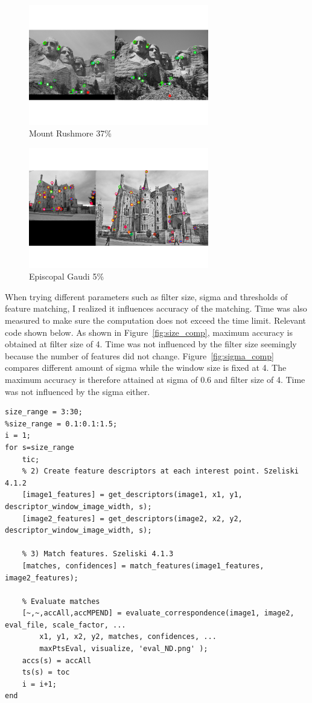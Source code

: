 \begin{figure}[h!]
	\centering
	\includegraphics[width=0.7\textwidth]{../code/eval_MR.png}
	\caption{Mount Rushmore 37\%}
	\label{fig:mr}
	\end{figure}
	
\begin{figure}[h!]
	\centering
	\includegraphics[width=0.7\textwidth]{../code/eval_EG.png}
	\caption{Episcopal Gaudi 5\%}
	\label{fig:eg}
\end{figure}

When trying different parameters such as filter size, sigma and thresholds of feature matching, I realized it influences accuracy of the matching. Time was also measured to make sure the computation does not exceed the time limit. Relevant code shown below. As shown in Figure~\ref{fig:size_comp}, maximum accuracy is obtained at filter size of 4. Time was not influenced by the filter size seemingly because the number of features did not change. Figure~\ref{fig:sigma_comp} compares different amount of sigma while the window size is fixed at 4. The maximum accuracy is therefore attained at sigma of 0.6 and filter size of 4. Time was not influenced by the sigma either.
\begin{lstlisting}[style=Matlab-editor]
size_range = 3:30;
%size_range = 0.1:0.1:1.5;
i = 1;
for s=size_range
	tic;
	% 2) Create feature descriptors at each interest point. Szeliski 4.1.2
	[image1_features] = get_descriptors(image1, x1, y1, descriptor_window_image_width, s);
	[image2_features] = get_descriptors(image2, x2, y2, descriptor_window_image_width, s);
	
	% 3) Match features. Szeliski 4.1.3
	[matches, confidences] = match_features(image1_features, image2_features);
	
	% Evaluate matches
	[~,~,accAll,accMPEND] = evaluate_correspondence(image1, image2, eval_file, scale_factor, ... 
		x1, y1, x2, y2, matches, confidences, ...
		maxPtsEval, visualize, 'eval_ND.png' );
	accs(s) = accAll
	ts(s) = toc
	i = i+1;
end
\end{lstlisting}


